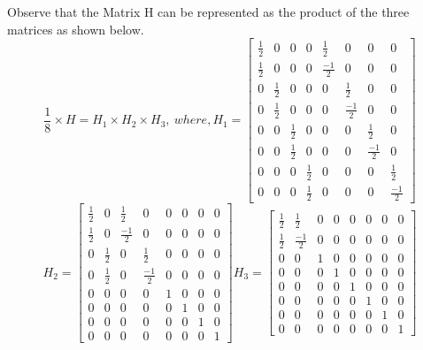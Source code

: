 \documentclass{article}
\begin{document}
\setlength{\parindent}{1cm}
Observe that the Matrix H can be represented as the product of the three matrices as shown below.
\begin{equation*}
    \frac{1}{8}\times H = H_1 \times H_2 \times H_3 , \ where,
    H_1 = \begin{bmatrix}
        \frac{1}{2} & 0 & 0 & 0 & \frac{1}{2} & 0 & 0 & 0 \\
        \frac{1}{2} & 0 & 0 & 0 & \frac{-1}{2} & 0 & 0 & 0 \\
        0 & \frac{1}{2} & 0 & 0 & 0 & \frac{1}{2} & 0 & 0 \\
        0 & \frac{1}{2} & 0 & 0 & 0 & \frac{-1}{2} & 0 & 0 \\
        0 & 0 & \frac{1}{2} & 0 & 0 & 0 & \frac{1}{2} & 0 \\
        0 & 0 & \frac{1}{2} & 0 & 0 & 0 & \frac{-1}{2} & 0 \\
        0 & 0 & 0 & \frac{1}{2} & 0 & 0 & 0 & \frac{1}{2}\\
        0 & 0 & 0 & \frac{1}{2} & 0 & 0 & 0 & \frac{-1}{2} 
    \end{bmatrix}
\end{equation*}
\begin{equation*}
    H_2 = \begin{bmatrix}
        \frac{1}{2} & 0 & \frac{1}{2} & 0 & 0 & 0 & 0 & 0 \\
        \frac{1}{2} & 0 & \frac{-1}{2} & 0 & 0 & 0 & 0 & 0 \\
        0 & \frac{1}{2} & 0 & \frac{1}{2} & 0 & 0 & 0 & 0 \\
        0 & \frac{1}{2} & 0 & \frac{-1}{2} & 0 & 0 & 0 & 0 \\
        0 & 0 & 0 & 0 & 1 & 0 & 0 & 0 \\
        0 & 0 & 0 & 0 & 0 & 1 & 0 & 0 \\
        0 & 0 & 0 & 0 & 0 & 0 & 1 & 0\\
        0 & 0 & 0 & 0 & 0 & 0 & 0 & 1 
    \end{bmatrix}
H_3 = \begin{bmatrix}
        \frac{1}{2} & \frac{1}{2} & 0 & 0 & 0 & 0 & 0 & 0 \\
        \frac{1}{2} & \frac{-1}{2} & 0 & 0 & 0 & 0 & 0 & 0 \\
        0 & 0 & 1 & 0 & 0 & 0 & 0 & 0 \\
        0 & 0 & 0 & 1 & 0 & 0 & 0 & 0 \\
        0 & 0 & 0 & 0 & 1 & 0 & 0 & 0 \\
        0 & 0 & 0 & 0 & 0 & 1 & 0 & 0 \\
        0 & 0 & 0 & 0 & 0 & 0 & 1 & 0\\
        0 & 0 & 0 & 0 & 0 & 0 & 0 & 1 
\end{bmatrix}
\end{equation*}
\end{document}
